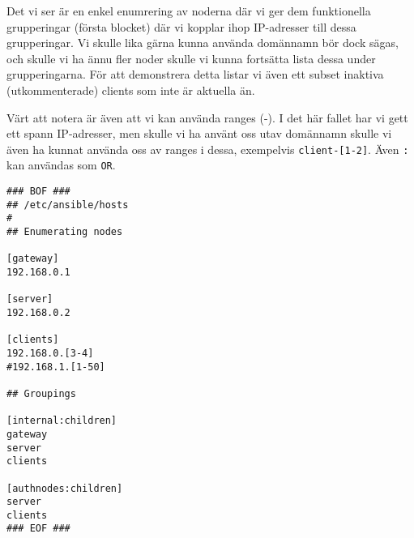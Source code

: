 Det vi ser är en enkel enumrering av noderna där vi ger dem funktionella grupperingar (första blocket) där vi
kopplar ihop IP-adresser till dessa grupperingar. Vi skulle lika gärna kunna använda domännamn bör dock sägas, och
skulle vi ha ännu fler noder skulle vi kunna fortsätta lista dessa under grupperingarna. För att demonstrera detta
listar vi även ett subset inaktiva (utkommenterade) clients som inte är aktuella än.

Värt att notera är även att vi kan använda ranges (-). I det här fallet har vi gett ett spann IP-adresser, men skulle vi ha använt oss utav domännamn skulle vi även ha kunnat använda oss av ranges i dessa, exempelvis \texttt{client-[1-2]}. Även \texttt{:} kan användas som \texttt{OR}.

\lstset{language=sh}
\begin{lstlisting}[frame=single]
### BOF ###
## /etc/ansible/hosts
#
## Enumerating nodes

[gateway]
192.168.0.1

[server]
192.168.0.2

[clients]
192.168.0.[3-4]
#192.168.1.[1-50]

## Groupings

[internal:children]
gateway
server
clients

[authnodes:children]
server
clients
### EOF ###
\end{lstlisting}

